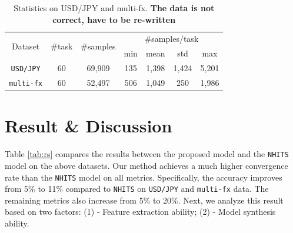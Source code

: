 \documentclass[aps,prb,groupedaddress,twocolumn,showpacs,dvipdfmx,superscriptaddress,pdftex]{revtex4-2}
\begin{document}
\begin{table}
    \centering
    \caption{Statistics on USD/JPY and multi-fx. \textbf{The data is not correct, have to be re-written}}
    \label{tab:stat_}
    \begin{tabular}{ccccccc} 
    \toprule
    \multirow{2}{*}{Dataset} & \multirow{2}{*}{\#task} & \multirow{2}{*}{\#samples} & \multicolumn{4}{c}{\#samples/task}  \\ 
    \cline{4-7}
                             &                         &                            & min & mean  & std   & max             \\ 
    \hline
    \Verb|USD/JPY|           & 60                      & 69,909                     & 135 & 1,398 & 1,424 & 5,201           \\
    \Verb|multi-fx|          & 60                      & 52,497                     & 506 & 1,049 & 250   & 1,986           \\
    \bottomrule
    \end{tabular}
\end{table}

\section{Result \& Discussion}
\label{sec.results}



Table \ref{tab:rs} compares the results between the proposed model and the \verb|NHITS| model on the above datasets. Our method achieves a much higher convergence rate than the \verb|NHITS| model on all metrics. Specifically, the accuracy improves from 5\% to 11\% compared to \verb|NHITS| on \verb|USD/JPY| and \verb|multi-fx| data. The remaining metrics also increase from 5\% to 20\%. Next, we analyze this result based on two factors: (1) - Feature extraction ability; (2) - Model synthesis ability.
\end{document}
